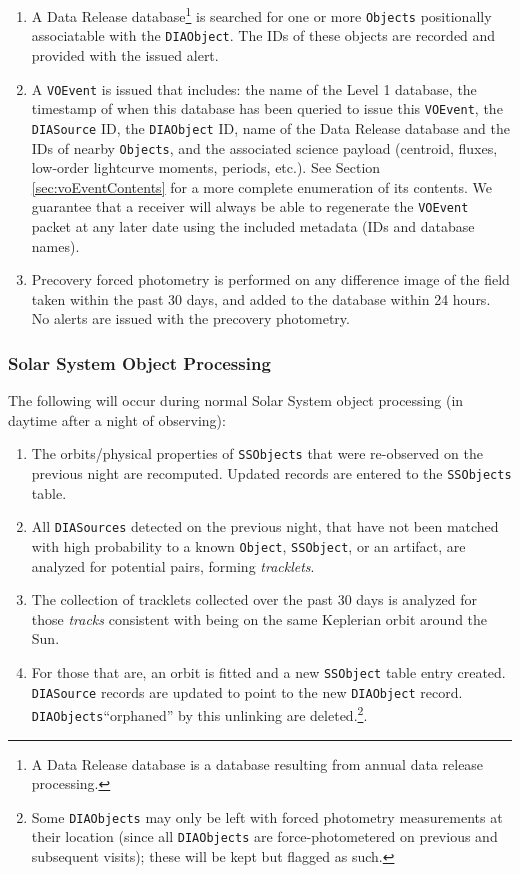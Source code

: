 \documentclass[12pt]{article}
\newcommand{\code}[1]{\texttt{#1}}
\newcommand{\DIASource}{\code{DIASource}\xspace}
\newcommand{\DIASources}{\code{DIASources}\xspace}
\newcommand{\DIAObject}{\code{DIAObject}\xspace}
\newcommand{\DIAObjects}{\code{DIAObjects}\xspace}
\newcommand{\DB}{{Level 1 database}\xspace}
\newcommand{\DR}{{Data Release database}\xspace}
\newcommand{\Object}{\code{Object}\xspace}
\newcommand{\Objects}{\code{Objects}\xspace}
\newcommand{\SSObject}{\code{SSObject}\xspace}
\newcommand{\SSObjects}{\code{SSObjects}\xspace}
\newcommand{\VOEvent}{\code{VOEvent}\xspace}
\begin{document}
\begin{enumerate}
\item A \DR\footnote{A \DR is a database resulting from annual data release processing.} is searched for one or more \Objects positionally associatable with the \DIAObject. The IDs of these objects are recorded and provided with the issued alert.
\item A \VOEvent is issued that includes: the name of the \DB, the timestamp of when this database has been queried to issue this \VOEvent, the \DIASource ID, the \DIAObject ID, name of the \DR and the IDs of nearby \Objects, and the associated science payload (centroid, fluxes, low-order lightcurve moments, periods, etc.). See Section \ref{sec:voEventContents} for a more complete enumeration of its contents. We guarantee that a receiver will always be able to regenerate the \VOEvent packet at any later date using the included metadata (IDs and database names).
\item Precovery forced photometry is performed on any difference image of the field taken within the past 30 days, and added to the database within 24 hours. No alerts are issued with the precovery photometry.
\end{enumerate}

\subsubsection{Solar System Object Processing}
\label{sec:ssProcessing}

The following will occur during normal Solar System object processing (in daytime after a night of observing):
\begin{enumerate}
\item The orbits/physical properties of \SSObjects that were re-observed on the previous night are recomputed. Updated records are entered to the \SSObjects table.
\item All \DIASources detected on the previous night, that have not been matched with high probability to a known \Object, \SSObject, or an artifact, are analyzed for potential pairs, forming {\em tracklets}.
\item The collection of tracklets collected over the past 30 days is analyzed for those {\em tracks} consistent with being on the same Keplerian orbit around the Sun.
\item For those that are, an orbit is fitted and a new \SSObject table entry created. \DIASource records are updated to point to the new \DIAObject record. \DIAObjects ``orphaned'' by this unlinking are deleted.\footnote{Some \DIAObjects may only be left with forced photometry measurements at their location (since all \DIAObjects are force-photometered on previous and subsequent visits);  these will be kept but flagged as such.}.
\end{enumerate}
\end{document}
